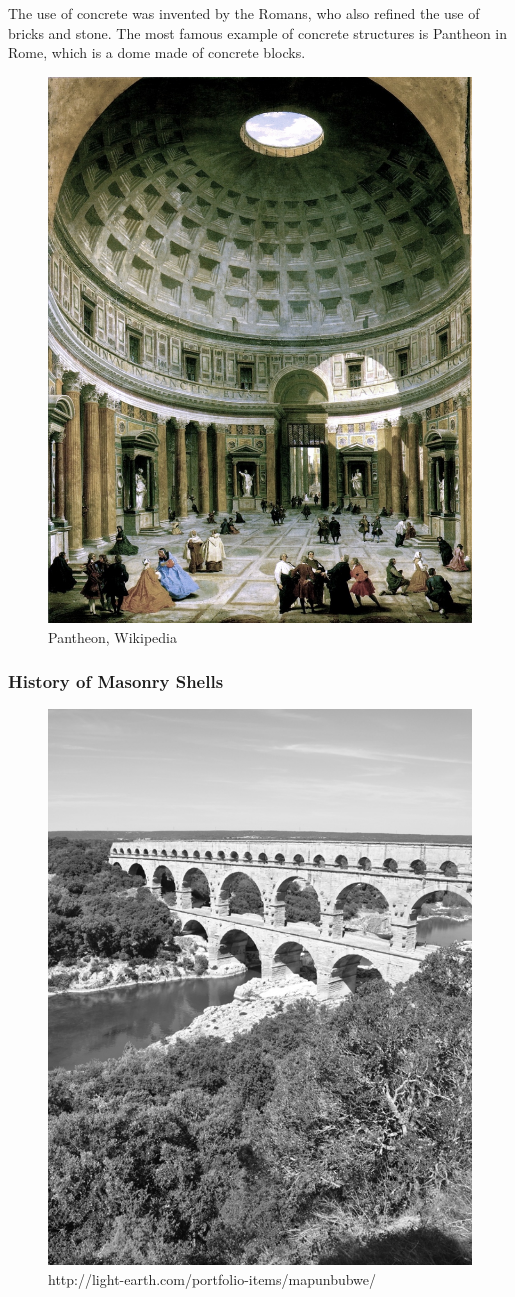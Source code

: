 The use of concrete was invented by the Romans, who also refined the use of bricks and stone. The most famous example of concrete structures is Pantheon in Rome, which is a dome made of concrete blocks.
\begin{figure}[H]
\centering
\includegraphics[width=0.5\linewidth ]{figure/Introduction/Pantheon.jpg}
\caption{Pantheon, Wikipedia}
\end{figure}


\subsubsection{History of Masonry Shells}

\begin{figure}[H]
\centering
\includegraphics[width=0.9\linewidth ]{figure/Introduction/roman_aq.jpg}
\caption{http://light-earth.com/portfolio-items/mapunbubwe/}

\end{figure}



